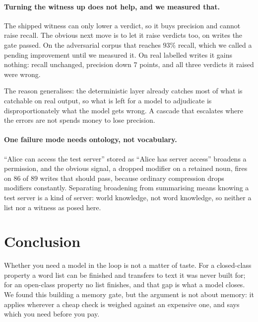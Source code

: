 \documentclass[11pt]{article}
\begin{document}
\paragraph{Turning the witness up does not help, and we measured that.}
The shipped witness can only lower a verdict, so it buys precision and cannot raise recall.
The obvious next move is to let it raise verdicts too, on writes the gate passed. On the
adversarial corpus that reaches $93\%$ recall, which we called a pending improvement until
we measured it. On real labelled writes it gains nothing: recall unchanged,
precision down $7$ points, and all three verdicts it raised were wrong.

The reason generalises: the deterministic layer already catches most of what is catchable
on real output, so what is left for a model to adjudicate is disproportionately what the
model gets wrong. A cascade that escalates where the errors are not spends money to lose
precision.

\paragraph{One failure mode needs ontology, not vocabulary.}
``Alice can access the test server'' stored as ``Alice has server access'' broadens a
permission, and the obvious signal, a dropped modifier on a retained noun, fires on $86$
of $89$ writes that should pass, because ordinary compression drops modifiers constantly.
Separating broadening from summarising means knowing a test server is a kind of server:
world knowledge, not word knowledge, so neither a list nor a witness as posed here.

\section{Conclusion}

Whether you need a model in the loop is not a matter of taste. For a closed-class
property a word list can be finished and transfers to text it was never built for; for
an open-class property no list finishes, and that gap is what a model closes. We found
this building a memory gate, but the argument is not about memory: it applies wherever a
cheap check is weighed against an expensive one, and says which you need before you pay.
\end{document}
